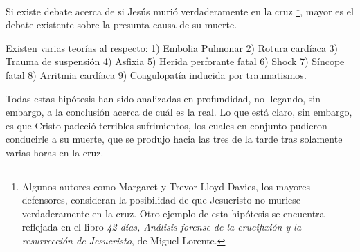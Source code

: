 Si existe debate acerca de si Jesús murió verdaderamente en la cruz \footnote{Algunos autores como Margaret y Trevor Lloyd Davies, los mayores defensores, consideran la posibilidad de que Jesucristo no muriese verdaderamente en la cruz. Otro ejemplo de esta hipótesis se encuentra reflejada en el libro \textit{42 días, Análisis forense de la crucifixión y la resurrección de Jesucristo}, de Miguel Lorente.}, mayor es el debate existente sobre la presunta causa de su muerte.

Existen varias teorías al respecto: 1) Embolia Pulmonar 2) Rotura cardíaca 3) Trauma de suspensión 4) Asfixia 5) Herida perforante fatal 6) Shock 7) Síncope fatal 8) Arritmia cardíaca 9) Coagulopatía inducida por traumatismos.

Todas estas hipótesis han sido analizadas en profundidad, no llegando, sin embargo, a la conclusión acerca de cuál es la real. Lo que está claro, sin embargo, es que Cristo padeció terribles sufrimientos, los cuales en conjunto pudieron conducirle a su muerte, que se produjo hacia las tres de la tarde tras solamente varias horas en la cruz.


